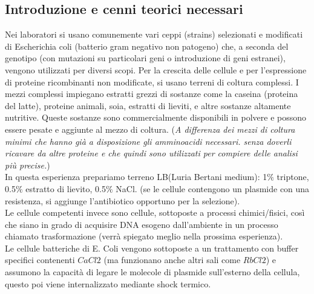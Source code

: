 \documentclass{extarticle}
\begin{document}
\subsection*{Introduzione e cenni teorici necessari} Nei laboratori si usano comunemente vari ceppi (strains)
selezionati e modificati di Escherichia coli (batterio gram negativo non patogeno) che, a seconda del genotipo (con mutazioni su particolari geni o introduzione di geni estranei),
vengono utilizzati per diversi scopi. Per la crescita delle cellule e per l'espressione di proteine ricombinanti non modificate, si usano terreni di coltura complessi. I mezzi complessi impiegano estratti grezzi di sostanze come la caseina
(proteina del latte), proteine animali, soia, estratti di lieviti, e altre sostanze altamente nutritive. Queste
sostanze sono commercialmente disponibili in polvere e possono essere pesate e aggiunte al mezzo di coltura.
(\textit{A differenza dei mezzi di coltura minimi che hanno già a disposizione gli amminoacidi necessari. senza doverli
ricavare da altre proteine e che quindi sono utilizzati per compiere delle analisi più
precise.})\\
In questa esperienza prepariamo terreno LB(Luria Bertani medium): 1$\%$ triptone, 0.5$\%$ estratto di lievito,
0.5$\%$ NaCl. (se le cellule contengono un plasmide con una resistenza, si aggiunge l'antibiotico opportuno per la selezione).\\
Le cellule competenti invece sono cellule, sottoposte a processi chimici/fisici, così che siano in grado di acquisire DNA esogeno dall'ambiente in un processo chiamato trasformazione (verrà spiegato meglio nella prossima esperienza).\\
Le cellule batteriche di E. Coli vengono sottoposte a un trattamento con buffer specifici contenenti  $CaCl2$ (ma funzionano anche altri sali come $RbCl2$) e assumono la capacità di legare le molecole di plasmide sull'esterno della cellula, questo poi viene internalizzato mediante shock termico. 
\end{document}
